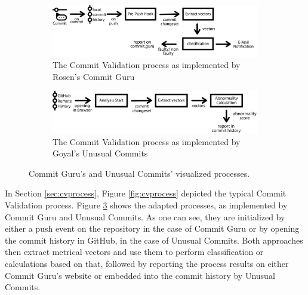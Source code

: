 \begin{figure}[t]
	\centering
	
	\begin{subfigure}[t]{\textwidth}
		\includegraphics[width=\textwidth]{images/commitvalidation-process/commitguruprocess-pdf}
		\caption{The Commit Validation process as implemented by Rosen's Commit Guru \cite{Rosen2015}}
		\label{fig:cvprocess-commitguru}
	\end{subfigure}
	
	\begin{subfigure}[t]{\textwidth}
		\includegraphics[width=\textwidth]{images/commitvalidation-process/unusualcommitsprocess-pdf}
		\caption{The Commit Validation process as implemented by Goyal's Unusual Commits \cite{Goyal2017}}
		\label{fig:cvprocess-unusual}
	\end{subfigure}
	\caption{Commit Guru's and Unusual Commits' visualized processes.}
	\label{fig:cvprocess-guru-unusual}
\end{figure}

In Section \ref{sec:cvprocess}, Figure \ref{fig:cvprocess} depicted the typical Commit Validation process. Figure \ref{fig:cvprocess-guru-unusual} shows the adapted processes, as implemented by Commit Guru and Unusual Commits. As one can see, they are initialized by either a push event on the repository in the case of Commit Guru or by opening the commit history in GitHub, in the case of Unusual Commits. Both approaches then extract metrical vectors and use them to perform classification or calculations based on that, followed by reporting the process results on either Commit Guru's website or embedded into the commit history by Unusual Commits.


